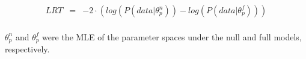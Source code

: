 \documentclass[12pt]{article}
\begin{document}
\begin{eqnarray}
LRT & = & -2 \cdot (log(P(data | \theta^n_p)) - log(P(data | \theta^f_p)))
\end{eqnarray}

\paragraph{}{
$\theta^n_p$ and $\theta^f_p$ were the MLE of the parameter spaces under the null and full models, respectively. 
}



\end{document}

